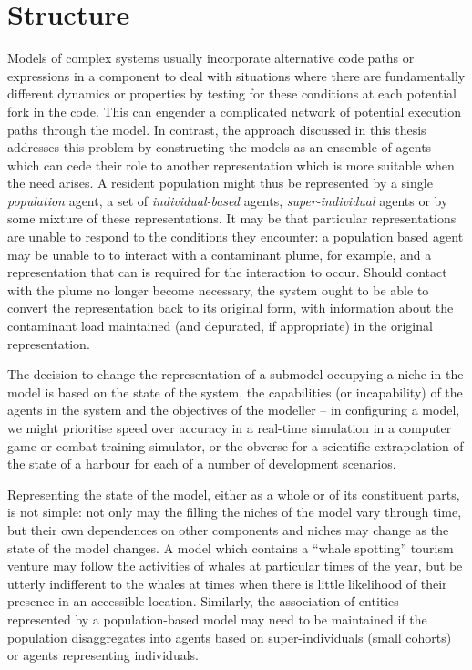 \section{Structure }
Models of complex systems usually incorporate alternative code paths
or expressions in a component to deal with situations where there are
fundamentally different dynamics or properties by testing for these
conditions at each potential fork in the code. This can engender a
complicated network of potential execution paths through the model.
In contrast, the approach discussed in this thesis addresses this
problem by constructing the models as an ensemble of agents which can
cede their role to another representation which is more suitable when
the need arises.  A resident population might thus be represented by a
single \emph{population\/} agent, a set of \emph{individual-based\/}
agents, \emph{super-individual\/} agents or by some mixture of these
representations.  It may be that particular representations are unable
to respond to the conditions they encounter: a population based agent
may be unable to to interact with a contaminant plume, for example,
and a representation that can is required for the interaction to
occur.  Should contact with the plume no longer become necessary, the
system ought to be able to convert the representation back to its
original form, with information about the contaminant load maintained
(and depurated, if appropriate) in the original representation.

The decision to change the representation of a submodel occupying a
niche in the model is based on the state of the system, the
capabilities (or incapability) of the agents in the system and the
objectives of the modeller -- in configuring a model, we might
prioritise speed over accuracy in a real-time simulation in a computer
game or combat training simulator, or the obverse for a scientific
extrapolation of the state of a harbour for each of a number of
development scenarios.

Representing the state of the model, either as a whole or of its
constituent parts, is not simple: not only may the filling the niches
of the model vary through time, but their own dependences on other
components and niches may change as the state of the model changes. A
model which contains a ``whale spotting'' tourism venture may follow
the activities of whales at particular times of the year, but be
utterly indifferent to the whales at times when there is little
likelihood of their presence in an accessible location. Similarly, the
association of entities represented by a population-based model may
need to be maintained if the population dis\-aggregates into agents
based on super-individuals (small cohorts) or agents representing
individuals.

